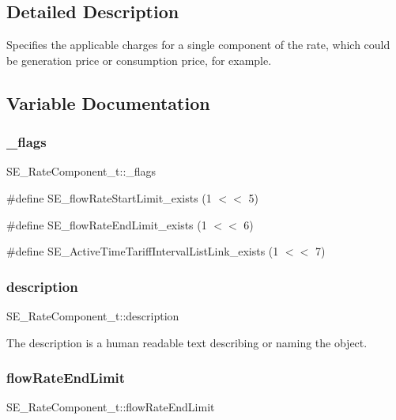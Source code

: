 \subsection{Detailed Description}
Specifies the applicable charges for a single component of the rate, which could be generation price or consumption price, for example. 

\subsection{Variable Documentation}
\mbox{\label{group__RateComponent_ga0c08e678db37ea8eb9fd67e3fcae4782}} 
\subsubsection{\texorpdfstring{\+\_\+flags}{\_flags}}
{\footnotesize\ttfamily S\+E\+\_\+\+Rate\+Component\+\_\+t\+::\+\_\+flags}

\#define S\+E\+\_\+flow\+Rate\+Start\+Limit\+\_\+exists (1 $<$$<$ 5)

\#define S\+E\+\_\+flow\+Rate\+End\+Limit\+\_\+exists (1 $<$$<$ 6)

\#define S\+E\+\_\+\+Active\+Time\+Tariff\+Interval\+List\+Link\+\_\+exists (1 $<$$<$ 7) \mbox{\label{group__RateComponent_gab7842f1806d07c3750119171d5637ced}} 
\subsubsection{\texorpdfstring{description}{description}}
{\footnotesize\ttfamily S\+E\+\_\+\+Rate\+Component\+\_\+t\+::description}

The description is a human readable text describing or naming the object. \mbox{\label{group__RateComponent_ga51e5dd2544cb9bb2fc30c5254f13ed7e}} 
\subsubsection{\texorpdfstring{flow\+Rate\+End\+Limit}{flowRateEndLimit}}
{\footnotesize\ttfamily S\+E\+\_\+\+Rate\+Component\+\_\+t\+::flow\+Rate\+End\+Limit}

